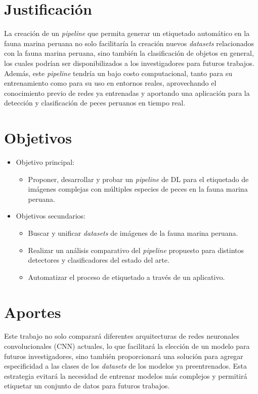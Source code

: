 \section{Justificación}

La creación de un \textit{pipeline} que permita generar un etiquetado 
automático en la fauna marina peruana no solo facilitaría la creación 
nuevos \textit{datasets} relacionados con la fauna marina peruana, sino 
también la clasificación de objetos en general, los cuales 
podrían ser disponibilizados a los investigadores para futuros trabajos. 
Además, este \textit{pipeline} tendría un bajo costo computacional, tanto 
para su entrenamiento como para su uso en entornos reales, aprovechando el 
conocimiento previo de redes ya entrenadas y aportando una aplicación para la 
detección y clasificación de peces peruanos en tiempo real.

\section{Objetivos}

\begin{itemize}
  \item { Objetivo principal: 
      \begin{itemize}
          \item Proponer, desarrollar y probar un 
              \textit{pipeline} de DL para el etiquetado de imágenes complejas 
              con múltiples especies de peces en la fauna marina peruana.
      \end{itemize}
   }
   \item { Objetivos secundarios:
      \begin{itemize}
          \item Buscar y unificar \textit{datasets} de imágenes de la fauna marina 
          peruana.
          \item Realizar un análisis comparativo del \textit{pipeline} propuesto para 
              distintos detectores y clasificadores del estado del arte. 
          \item Automatizar el proceso de etiquetado a través de un aplicativo.
      \end{itemize}
      }
\end{itemize}

\section{Aportes}

Este trabajo no solo comparará diferentes arquitecturas 
de redes neuronales convolucionales (CNN) actuales, lo que facilitará la 
elección de un modelo para futuros investigadores, sino también proporcionará 
una solución para agregar especificidad a las clases de los \textit{datasets} 
de los modelos ya preentrenados. Esta estrategia evitará la necesidad de 
entrenar modelos más complejos y permitirá etiquetar un conjunto de datos 
para futuros trabajos.
